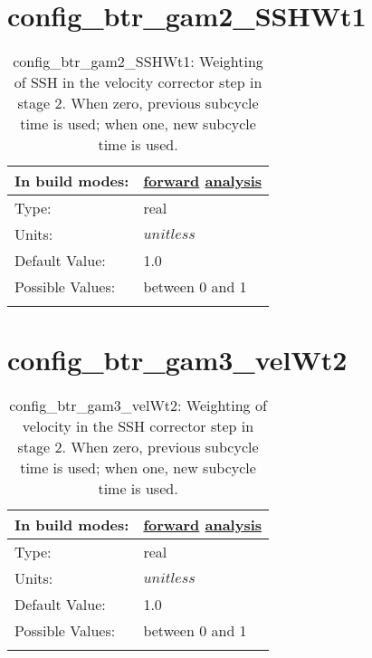 \section[config\_btr\_gam2\_SSHWt1]{config\_btr\_gam2\_SSHWt1}
\label{sec:nm_sec_config_btr_gam2_SSHWt1}
\begin{center}
\begin{longtable}{| p{2.0in} || p{4.0in} |}
    \hline
    In build modes: & \hyperref[subsec:forward_nm_tab_split_explicit_ts]{forward} \hyperref[subsec:analysis_nm_tab_split_explicit_ts]{analysis} \\
    \hline
    Type: & real \\
    \hline
    Units: & $unitless$ \\
    \hline
    Default Value: & 1.0 \\
    \hline
    Possible Values: & between 0 and 1 \\
    \hline
    \caption{config\_btr\_gam2\_SSHWt1: Weighting of SSH in the velocity corrector step in stage 2.  When zero, previous subcycle time is used; when one, new subcycle time is used.}
\end{longtable}
\end{center}
\section[config\_btr\_gam3\_velWt2]{config\_btr\_gam3\_velWt2}
\label{sec:nm_sec_config_btr_gam3_velWt2}
\begin{center}
\begin{longtable}{| p{2.0in} || p{4.0in} |}
    \hline
    In build modes: & \hyperref[subsec:forward_nm_tab_split_explicit_ts]{forward} \hyperref[subsec:analysis_nm_tab_split_explicit_ts]{analysis} \\
    \hline
    Type: & real \\
    \hline
    Units: & $unitless$ \\
    \hline
    Default Value: & 1.0 \\
    \hline
    Possible Values: & between 0 and 1 \\
    \hline
    \caption{config\_btr\_gam3\_velWt2: Weighting of velocity in the SSH corrector step in stage 2.  When zero, previous subcycle time is used; when one, new subcycle time is used.}
\end{longtable}
\end{center}
